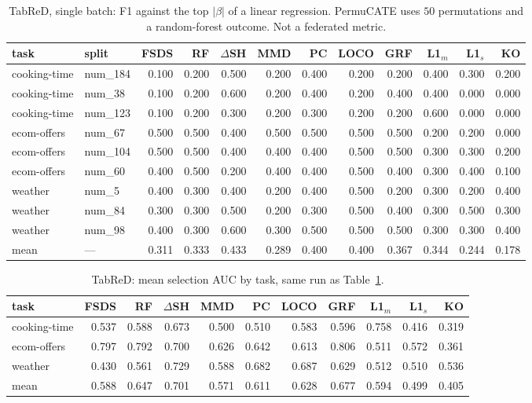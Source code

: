\begin{table}[t]
\centering
\footnotesize
\renewcommand{\arraystretch}{1.15}
\setlength{\tabcolsep}{3.5pt}
\caption{TabReD, single batch: F1 against the top \(|\beta|\) of a linear
regression.
PermuCATE uses \(50\) permutations and a random-forest outcome.
Not a federated metric.}
\label{tab:tabred-fsds-all}
\begin{tabular}{@{}ll *{10}{r}@{}}
\toprule
task & split & FSDS & RF & \(\Delta\)SH & MMD & PC & LOCO & GRF & L1\(_m\) & L1\(_s\) & KO \\
\midrule
cooking-time & num\_184 & 0.100 & 0.200 & 0.500 & 0.200 & 0.400 & 0.200 & 0.200 & 0.400 & 0.300 & 0.200 \\
cooking-time & num\_38  & 0.100 & 0.200 & 0.600 & 0.200 & 0.400 & 0.200 & 0.400 & 0.400 & 0.000 & 0.000 \\
cooking-time & num\_123 & 0.100 & 0.200 & 0.300 & 0.200 & 0.300 & 0.200 & 0.200 & 0.600 & 0.000 & 0.000 \\
ecom-offers  & num\_67  & 0.500 & 0.500 & 0.400 & 0.500 & 0.500 & 0.500 & 0.500 & 0.200 & 0.200 & 0.000 \\
ecom-offers  & num\_104 & 0.500 & 0.500 & 0.400 & 0.400 & 0.400 & 0.500 & 0.500 & 0.300 & 0.300 & 0.200 \\
ecom-offers  & num\_60  & 0.400 & 0.500 & 0.200 & 0.400 & 0.400 & 0.500 & 0.400 & 0.300 & 0.400 & 0.100 \\
weather      & num\_5   & 0.400 & 0.300 & 0.400 & 0.200 & 0.400 & 0.500 & 0.200 & 0.300 & 0.200 & 0.400 \\
weather      & num\_84  & 0.300 & 0.300 & 0.500 & 0.200 & 0.300 & 0.500 & 0.400 & 0.300 & 0.500 & 0.300 \\
weather      & num\_98  & 0.400 & 0.300 & 0.600 & 0.300 & 0.500 & 0.500 & 0.500 & 0.300 & 0.300 & 0.400 \\
\midrule
mean & --- & 0.311 & 0.333 & 0.433 & 0.289 & 0.400 & 0.400 & 0.367 & 0.344 & 0.244 & 0.178 \\
\bottomrule
\end{tabular}
\end{table}

\begin{table}[t]
\centering
\small
\setlength{\tabcolsep}{3.5pt}
\caption{TabReD: mean selection AUC by task, same run as
Table~\ref{tab:tabred-fsds-all}.}
\label{tab:tabred-fsds-auc}
\begin{tabular}{@{}l *{10}{r}@{}}
\toprule
task & FSDS & RF & \(\Delta\)SH & MMD & PC & LOCO & GRF & L1\(_m\) & L1\(_s\) & KO \\
\midrule
cooking-time & 0.537 & 0.588 & 0.673 & 0.500 & 0.510 & 0.583 & 0.596 & 0.758 & 0.416 & 0.319 \\
ecom-offers  & 0.797 & 0.792 & 0.700 & 0.626 & 0.642 & 0.613 & 0.806 & 0.511 & 0.572 & 0.361 \\
weather      & 0.430 & 0.561 & 0.729 & 0.588 & 0.682 & 0.687 & 0.629 & 0.512 & 0.510 & 0.536 \\
\midrule
mean         & 0.588 & 0.647 & 0.701 & 0.571 & 0.611 & 0.628 & 0.677 & 0.594 & 0.499 & 0.405 \\
\bottomrule
\end{tabular}
\end{table}

